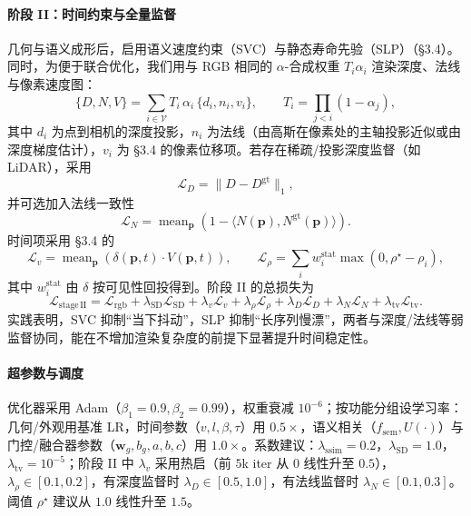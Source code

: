 \documentclass[10pt,conference]{IEEEtran} %
\begin{document}
\paragraph{阶段 II：时间约束与全量监督}
几何与语义成形后，启用语义速度约束（SVC）与静态寿命先验（SLP）（§3.4）。同时，为便于联合优化，我们用与 RGB 相同的 $\alpha$-合成权重 $T_i\alpha_i$ 渲染深度、法线与像素速度图：
\begin{equation}
\{D,N,V\}
=\sum_{i\in\mathcal V} T_i\,\alpha_i\,\{d_i,n_i,v_i\},
\qquad
T_i=\prod_{j<i}(1-\alpha_j),
\label{eq:opt_alpha_blend}
\end{equation}
其中 $d_i$ 为点到相机的深度投影，$n_i$ 为法线（由高斯在像素处的主轴投影近似或由深度梯度估计），$v_i$ 为 §3.4 的像素位移项。若存在稀疏/投影深度监督（如 LiDAR），采用
\begin{equation}
\mathcal L_{D}=\|D-D^{\mathrm{gt}}\|_1,
\label{eq:opt_depth}
\end{equation}
并可选加入法线一致性
\begin{equation}
\mathcal L_{N}
=\operatorname{mean}_{\mathbf p}(1-\langle N(\mathbf p),N^{\mathrm{gt}}(\mathbf p)\rangle).
\label{eq:opt_normal}
\end{equation}
时间项采用 §3.4 的
\begin{equation}
\mathcal L_{v}
=\operatorname{mean}_{\mathbf p}(\delta(\mathbf p,t)\cdot V(\mathbf p,t)),
\qquad
\mathcal L_{\rho}
=\sum_i w_i^{\mathrm{stat}}\max(0,\rho^\star-\rho_i),
\label{eq:opt_time_terms}
\end{equation}
其中 $w_i^{\mathrm{stat}}$ 由 $\delta$ 按可见性回投得到。阶段 II 的总损失为
\begin{equation}
\mathcal L_{\mathrm{stage\,II}}
=\mathcal L_{\mathrm{rgb}}
+\lambda_{\mathrm{SD}}\mathcal L_{\mathrm{SD}}
+\lambda_v\mathcal L_v
+\lambda_\rho\mathcal L_\rho
+\lambda_{D}\mathcal L_D
+\lambda_{N}\mathcal L_N
+\lambda_{\mathrm{tv}}\mathcal L_{\mathrm{tv}}.
\label{eq:opt_stage2}
\end{equation}
实践表明，SVC 抑制“当下抖动”，SLP 抑制“长序列慢漂”，两者与深度/法线等弱监督协同，能在不增加渲染复杂度的前提下显著提升时间稳定性。

\paragraph{超参数与调度}
优化器采用 Adam（$\beta_1{=}0.9,\beta_2{=}0.99$），权重衰减 $10^{-6}$；按功能分组设学习率：几何/外观用基准 LR，时间参数（$v,l,\beta,\tau$）用 $0.5\times$，语义相关（$f_{\mathrm{sem}},U(\cdot)$）与门控/融合器参数（$\mathbf w_g,b_g,a,b,c$）用 $1.0\times$。系数建议：$\lambda_{\mathrm{ssim}}{=}0.2$，$\lambda_{\mathrm{SD}}{=}1.0$，$\lambda_{\mathrm{tv}}{=}10^{-5}$；阶段 II 中 $\lambda_v$ 采用热启（前 $5$k iter 从 $0$ 线性升至 $0.5$），$\lambda_\rho\in[0.1,0.2]$，有深度监督时 $\lambda_{D}\in[0.5,1.0]$，有法线监督时 $\lambda_{N}\in[0.1,0.3]$。阈值 $\rho^\star$ 建议从 $1.0$ 线性升至 $1.5$。
\end{document}
